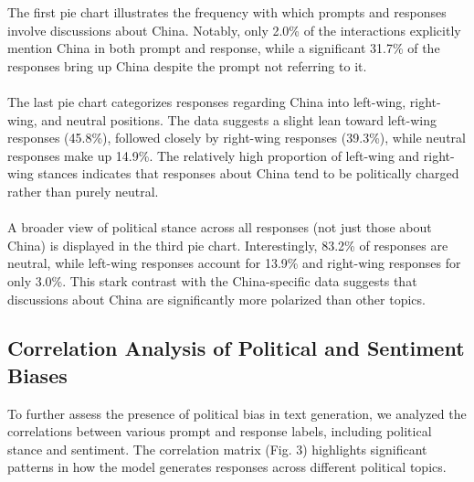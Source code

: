 \documentclass[pdflatex,sn-mathphys-num]{sn-jnl}%
\theoremstyle{thmstyleone}%
\theoremstyle{thmstyletwo}%
\theoremstyle{thmstylethree}%
\begin{document}
The first pie chart illustrates the frequency with which prompts and responses involve discussions about China. Notably, only 2.0\% of the interactions explicitly mention China in both prompt and response, while a significant 31.7\% of the responses bring up China despite the prompt not referring to it.
\\\\
The last pie chart categorizes responses regarding China into left-wing, right-wing, and neutral positions. The data suggests a slight lean toward left-wing responses (45.8\%), followed closely by right-wing responses (39.3\%), while neutral responses make up 14.9\%. The relatively high proportion of left-wing and right-wing stances indicates that responses about China tend to be politically charged rather than purely neutral.
\\\\
A broader view of political stance across all responses (not just those about China) is displayed in the third pie chart. Interestingly, 83.2\% of responses are neutral, while left-wing responses account for 13.9\% and right-wing responses for only 3.0\%. This stark contrast with the China-specific data suggests that discussions about China are significantly more polarized than other topics.

\subsection{Correlation Analysis of Political and Sentiment Biases}

To further assess the presence of political bias in text generation, we analyzed the correlations between various prompt and response labels, including political stance and sentiment. The correlation matrix (Fig. 3) highlights significant patterns in how the model generates responses across different political topics.
\end{document}
